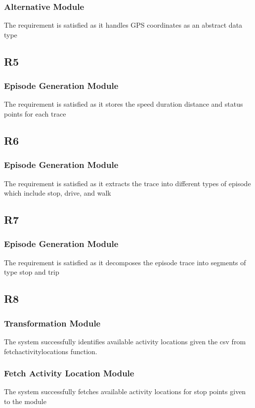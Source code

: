 \documentclass[12pt, titlepage]{article}
\begin{document}
\subsubsection{Alternative Module}
The requirement is satisfied as it handles GPS coordinates as an abstract data type
\subsection{R5}
\subsubsection{Episode Generation Module}
The requirement is satisfied as it stores the speed duration distance and status points for each trace

\subsection{R6}
\subsubsection{Episode Generation Module}
The requirement is satisfied as it extracts the trace into different types of episode which include stop, drive, and walk
\subsection{R7}
\subsubsection{Episode Generation Module}
The requirement is satisfied as it decomposes the episode trace into segments of type stop and trip
\subsection{R8}
\subsubsection{Transformation Module}
The system successfully identifies available activity locations given the csv from fetchactivitylocations function.
\subsubsection{Fetch Activity Location Module}
The system successfully fetches available activity locations for stop points given to the module
\end{document}
